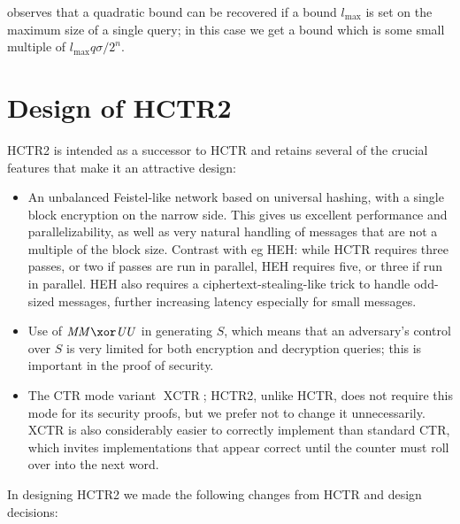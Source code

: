 \documentclass[letterpaper,11pt]{article}
\newcommand*{\MM}{\mathit{MM}}
\newcommand*{\UU}{\mathit{UU}}
\DeclareMathOperator{\XCTR}{XCTR}
\begin{document}
\cite{nandimail} observes that a quadratic bound can be recovered
if a bound \(l_\mathrm{max}\) is set on the maximum size of
a single query; in this case we get a bound
which is some small multiple of \(l_\mathrm{max}q\sigma/2^n\).

\section{Design of HCTR2}
HCTR2 is intended as a successor to HCTR and retains several of the
crucial features that make it an attractive design:
\begin{itemize}
    \item An unbalanced Feistel-like network based on universal
    hashing, with a single block encryption on the narrow side.
    This gives us excellent performance and parallelizability,
    as well as very natural handling of messages that are not
    a multiple of the block size. Contrast with eg HEH\cite{heh}:
    while HCTR requires three passes, or two if passes are
    run in parallel, HEH requires five, or three if run in parallel.
    HEH also requires a ciphertext-stealing-like trick to
    handle odd-sized messages, further increasing
    latency especially for small messages.
    \item Use of \(\MM \xor \UU\) in generating \(S\), which means
    that an adversary's control over \(S\) is very limited for both
    encryption and decryption queries; this is important in the
    proof of security.
    \item The CTR mode variant \(\XCTR\); HCTR2, unlike HCTR,
    does not require this mode for its security proofs, 
    but we prefer not to change it unnecessarily.
    XCTR is also considerably easier to correctly
    implement than standard CTR, which invites
    implementations that appear correct
    until the counter must roll over into 
    the next word.
\end{itemize}

In designing HCTR2 we made the following changes from HCTR and design decisions:
\end{document}
